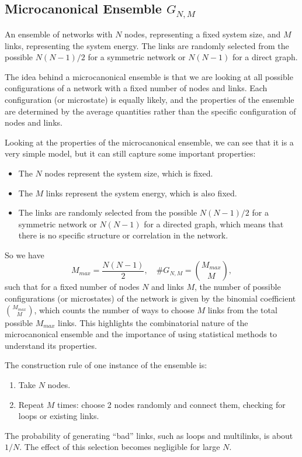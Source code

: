 \subsection{Microcanonical Ensemble $G_{N,M}$}

\begin{definition}
    An ensemble of networks with $N$ nodes, representing a fixed system size, and $M$ links, representing the system energy. The links are randomly selected from the possible $N(N-1)/2$ for a symmetric network or $N(N-1)$ for a direct graph.
\end{definition}

The idea behind a microcanonical ensemble is that we are looking at all possible configurations of a network with a fixed number of nodes and links. Each configuration (or microstate) is equally likely, and the properties of the ensemble are determined by the average quantities rather than the specific configuration of nodes and links.

Looking at the properties of the microcanonical ensemble, we can see that it is a very simple model, but it can still capture some important properties:
\begin{itemize}
    \item The \(N\) nodes represent the system size, which is fixed.
    \item The \(M\) links represent the system energy, which is also fixed.
    \item The links are randomly selected from the possible \(N(N-1)/2\) for a symmetric network or \(N(N-1)\) for a directed graph, which means that there is no specific structure or correlation in the network.
\end{itemize}
So we have
\[
    M_{max} = \frac{N(N-1)}{2}, \quad \# G_{N,M} = \binom{M_{max}}{M},
\]
such that for a fixed number of nodes \(N\) and links \(M\), the number of possible configurations (or microstates) of the network is given by the binomial coefficient \(\binom{M_{max}}{M}\), which counts the number of ways to choose \(M\) links from the total possible \(M_{max}\) links. This highlights the combinatorial nature of the microcanonical ensemble and the importance of using statistical methods to understand its properties.

\begin{remark}
    The construction rule of one instance of the ensemble is:
    \begin{enumerate}
        \item Take $N$ nodes.
        \item Repeat $M$ times: choose 2 nodes randomly and connect them, checking for loops or existing links.
    \end{enumerate}
    The probability of generating ``bad'' links, such as loops and multilinks, is about $1/N$. The effect of this selection becomes negligible for large $N$.
\end{remark}

